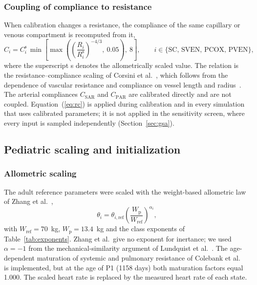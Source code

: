 \documentclass{article}
\begin{document}
\subsubsection{Coupling of compliance to resistance}
\label{sec:rc}
When calibration changes a resistance, the compliance of the same capillary or venous compartment is recomputed from it,
\begin{equation}
C_i = C_{i}^{\mathrm{s}}\,\min\!\left[\max\!\left(\left(\frac{R_i}{R_i^{\mathrm{s}}}\right)^{-4/3},\ 0.05\right),\ 8\right],
\qquad i \in \{\mathrm{SC},\,\mathrm{SVEN},\,\mathrm{PCOX},\,\mathrm{PVEN}\},
\label{eq:rc}
\end{equation}
where the superscript s denotes the allometrically scaled value. The relation is the resistance--compliance scaling of Corsini et al.~\cite{Corsini2014}, which follows from the dependence of vascular resistance and compliance on vessel length and radius~\cite{Pennati2000}. The arterial compliances $C_{\mathrm{SAR}}$ and $C_{\mathrm{PAR}}$ are calibrated directly and are not coupled. Equation~(\ref{eq:rc}) is applied during calibration and in every simulation that uses calibrated parameters; it is not applied in the sensitivity screen, where every input is sampled independently (Section~\ref{sec:gsa}).

\FloatBarrier
\subsection{Pediatric scaling and initialization}
\label{sec:scaling}

\subsubsection{Allometric scaling}
The adult reference parameters were scaled with the weight-based allometric law of Zhang et al.~\cite{zhang2019multiscale},
\begin{equation}
\theta_i = \theta_{i,\mathrm{ref}} \left(\frac{W_{\mathrm{p}}}{W_{\mathrm{ref}}}\right)^{\alpha_i},
\label{eq:scaling}
\end{equation}
with $W_{\mathrm{ref}} = 70$~kg, $W_{\mathrm{p}} = 13.4$~kg and the class exponents of Table~\ref{tab:exponents}. Zhang et al.\ give no exponent for inertance; we used $\alpha = -1$ from the mechanical-similarity argument of Lundquist et al.~\cite{Lundquist2025}. The age-dependent maturation of systemic and pulmonary resistance of Colebank et al.~\cite{Colebank2026} is implemented, but at the age of P1 (1158 days) both maturation factors equal 1.000. The scaled heart rate is replaced by the measured heart rate of each state.
\end{document}
